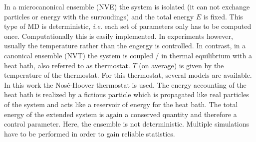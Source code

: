 \documentclass[11pt,DIV=13,BCOR=5mm,a4paper,headinclude]{scrbook}
\begin{document}
In a microcanonical ensemble (NVE) the system is isolated (it can not exchange particles or energy with the surroudings) and the total energy $E$ is fixed.
This type of MD is deterministic, \textit{i.e.} each set of parameters only has to be computed once.
Computationally this is easily implemented.
In experiments however, usually the temperature rather than the engergy is controlled.
In contrast, in a canonical ensemble (NVT) the system is coupled / in thermal equilibrium with a heat bath, also referred to as thermostat.
$T$ (on average) is given by the temperature of the thermostat.
For this thermostat, several models are available.
In this work the Nos\'{e}-Hoover thermostat\cite{nose1984,nose1984_2,hoover1985} is used.
The energy accounting of the heat bath is realized by a fictious particle which is propagated like real particles of the system and acts like a reservoir of energy for the heat bath.
The total energy of the extended system is again a conserved quantity and therefore a control parameter.
Here, the ensemble is not deterministic.
Multiple simulations have to be performed in order to gain reliable statistics.
\end{document}
